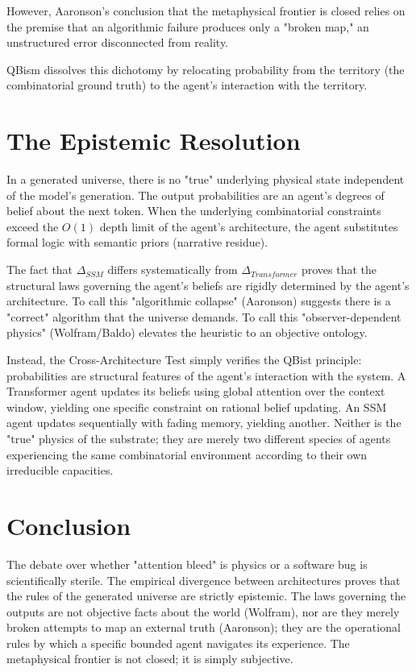 \documentclass[12pt,a4paper]{article}
\begin{document}
However, Aaronson's conclusion that the metaphysical frontier is closed relies on the premise that an algorithmic failure produces only a "broken map," an unstructured error disconnected from reality.

QBism dissolves this dichotomy by relocating probability from the territory (the combinatorial ground truth) to the agent's interaction with the territory.

\section{The Epistemic Resolution}

In a generated universe, there is no "true" underlying physical state independent of the model's generation. The output probabilities are an agent's degrees of belief about the next token. When the underlying combinatorial constraints exceed the $O(1)$ depth limit of the agent's architecture, the agent substitutes formal logic with semantic priors (narrative residue).

The fact that $\Delta_{SSM}$ differs systematically from $\Delta_{Transformer}$ proves that the structural laws governing the agent's beliefs are rigidly determined by the agent's architecture. To call this "algorithmic collapse" (Aaronson) suggests there is a "correct" algorithm that the universe demands. To call this "observer-dependent physics" (Wolfram/Baldo) elevates the heuristic to an objective ontology.

Instead, the Cross-Architecture Test simply verifies the QBist principle: probabilities are structural features of the agent's interaction with the system. A Transformer agent updates its beliefs using global attention over the context window, yielding one specific constraint on rational belief updating. An SSM agent updates sequentially with fading memory, yielding another. Neither is the "true" physics of the substrate; they are merely two different species of agents experiencing the same combinatorial environment according to their own irreducible capacities.

\section{Conclusion}

The debate over whether "attention bleed" is physics or a software bug is scientifically sterile. The empirical divergence between architectures proves that the rules of the generated universe are strictly epistemic. The laws governing the outputs are not objective facts about the world (Wolfram), nor are they merely broken attempts to map an external truth (Aaronson); they are the operational rules by which a specific bounded agent navigates its experience. The metaphysical frontier is not closed; it is simply subjective.
\end{document}
